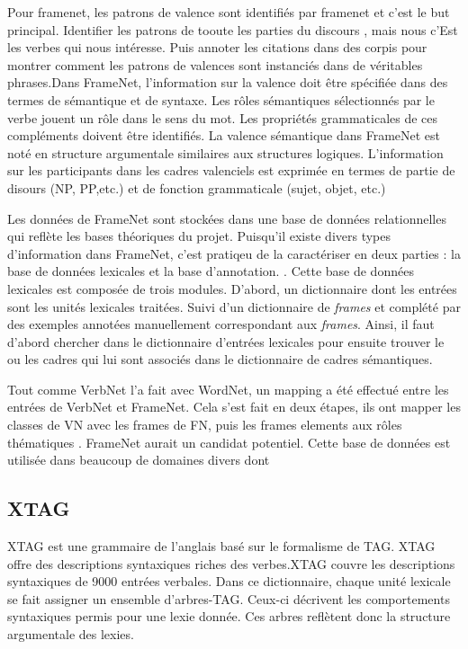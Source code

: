 Pour framenet, les patrons de valence sont identifiés par framenet et c'est le but principal. Identifier les patrons de tooute les parties du discours , mais nous c'Est les verbes qui nous intéresse. Puis annoter les citations dans des corpis pour montrer comment les patrons de valences sont instanciés dans de véritables phrases.Dans FrameNet, l'information sur la valence doit être spécifiée dans des termes de sémantique et de syntaxe. Les rôles sémantiques sélectionnés par le verbe jouent un rôle dans le sens du mot. Les propriétés grammaticales de ces compléments doivent être identifiés. La valence sémantique dans FrameNet est noté en structure argumentale similaires aux structures logiques. L'information sur les participants dans les cadres valenciels est exprimée en termes de partie de disours (NP, PP,etc.) et de fonction grammaticale (sujet, objet, etc.)

Les données de FrameNet sont stockées dans une base de données relationnelles qui reflète les bases théoriques du projet. Puisqu'il existe divers types d'information dans FrameNet, c'est pratiqeu de la caractériser en deux parties : la base de données lexicales et la base d'annotation. . Cette base de données lexicales est composée de trois modules. D'abord, un dictionnaire dont les entrées sont les unités lexicales traitées. Suivi d'un dictionnaire de \emph{frames} et complété par des exemples annotées manuellement correspondant aux \emph{frames}. Ainsi, il faut d'abord chercher dans le dictionnaire d'entrées lexicales pour ensuite trouver le ou les cadres qui lui sont associés dans le dictionnaire de cadres sémantiques. 

Tout comme VerbNet l'a fait avec WordNet, un mapping a été effectué entre les entrées de VerbNet et FrameNet. Cela s'est fait en deux étapes, ils ont mapper les classes de VN avec les frames de FN, puis les frames elements aux rôles thématiques \citep{Shi:2005:PPT:2132047.2132058}. FrameNet aurait un candidat potentiel. Cette base de données est utilisée dans beaucoup de domaines divers dont 

\subsection{XTAG}

XTAG \citep{ResearchGroupLexicalizedTreeAdjoining2001} est une grammaire de l'anglais basé sur le formalisme de \acf{TAG}. XTAG offre des descriptions syntaxiques riches des verbes.XTAG couvre les descriptions syntaxiques de 9000 entrées verbales.  Dans ce dictionnaire, chaque unité lexicale se fait assigner un ensemble d'arbres-TAG. Ceux-ci décrivent les comportements syntaxiques permis pour une lexie donnée. Ces arbres reflètent donc la structure argumentale des lexies.

